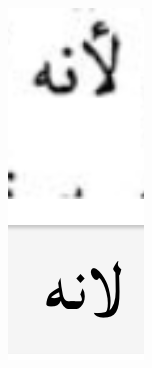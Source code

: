 \begin{figure}[!ht]
\begin{subfigure}[b]{0.3\linewidth}
	\includegraphics[width=\textwidth]{images/image29.png}

\end{subfigure}
\end{figure}
